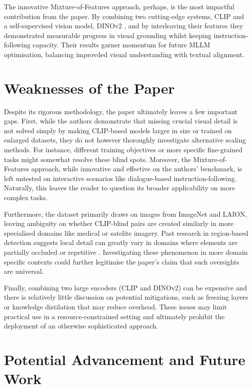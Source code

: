 \documentclass[11pt]{article}
\begin{document}
The innovative Mixture-of-Features approach, perhaps, is the most impactful contribution from the paper. By combining two cutting-edge systems, CLIP \cite{Radford2021ICML} and a self-supervised vision model, DINOv2 \cite{Oquab2023DINOv2}, and by interleaving their features they demonstrated measurable progress in visual grounding whilst keeping instruction-following capacity.
Their results garner momentum for future MLLM optimisation, balancing improvded visual understanding with textual alignment.

\section*{Weaknesses of the Paper}

Despite its rigorous methodology, the paper ultimately leaves a few important gaps. First, while the authors demonstrate that missing crucial visual detail is not solved simply by making CLIP-based models larger in size or trained on enlarged datasets, they do not however thoroughly investigate alternative scaling methods.
For instance, different training objectives or more specific fine-grained tasks might somewhat resolve these blind spots. Moreover, the Mixture-of-Features approach, while innovative and effective on the authors' benchmark, is left untested on interactive scenarios like dialogue-based instruction-following. Naturally, this leaves the reader to question its broader applicability on more complex tasks.

Furthermore, the dataset primarily draws on images from ImageNet and LAION, leaving ambiguity on whether CLIP-blind pairs are created similarly in more specialised domains like medical or satelite imagery. Past research in region-based detection suggests local detail can greatly vary in domains where elements are partially occluded or repetitive \cite{Girshick2014CVPR}.
Investigating these phenomenon in more domain specific contexts could further legitimise the paper's claim that such oversights are universal.

Finally, combining two large encoders (CLIP and DINOv2) can be expensive and there is relatively little discussion on potential mitigations, such as freezing layers or knowledge distilation that may reduce overhead. These issues may limit practical use in a resource-constrained setting and ultimately prohibit the deployment of an otherwise sophisticated approach.

\section*{Potential Advancement and Future Work}
\end{document}
